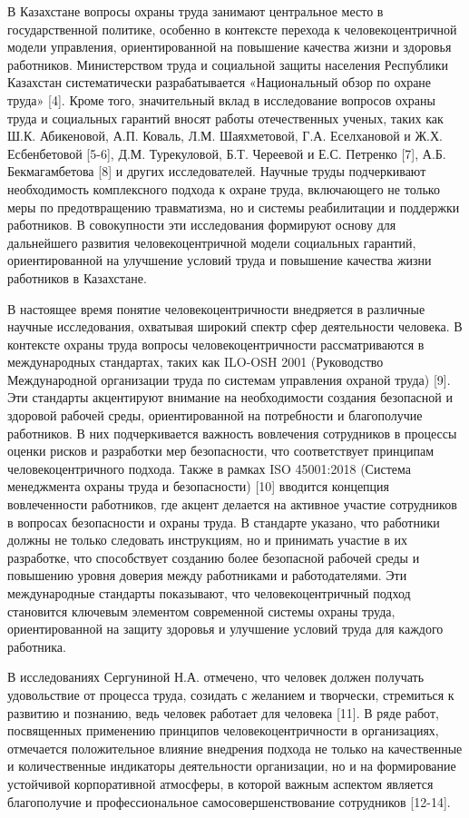 В Казахстане вопросы охраны труда занимают центральное место в
государственной политике, особенно в контексте перехода к
человекоцентричной модели управления, ориентированной на повышение
качества жизни и здоровья работников. Министерством труда и социальной
защиты населения Республики Казахстан систематически разрабатывается
«Национальный обзор по охране труда» {[}4{]}. Кроме того, значительный
вклад в исследование вопросов охраны труда и социальных гарантий вносят
работы отечественных ученых, таких как Ш.К. Абикеновой, А.П. Коваль,
Л.М. Шаяхметовой, Г.А. Еселхановой и Ж.Х. Есбенбетовой {[}5-6{]}, Д.М.
Турекуловой, Б.Т. Череевой и Е.С. Петренко {[}7{]}, А.Б. Бекмагамбетова
{[}8{]} и других исследователей. Научные труды подчеркивают
необходимость комплексного подхода к охране труда, включающего не только
меры по предотвращению травматизма, но и системы реабилитации и
поддержки работников. В совокупности эти исследования формируют основу
для дальнейшего развития человекоцентричной модели социальных гарантий,
ориентированной на улучшение условий труда и повышение качества жизни
работников в Казахстане.

В настоящее время понятие человекоцентричности внедряется в различные
научные исследования, охватывая широкий спектр сфер деятельности
человека. В контексте охраны труда вопросы человекоцентричности
рассматриваются в международных стандартах, таких как ILO-OSH 2001
(Руководство Международной организации труда по системам управления
охраной труда) {[}9{]}. Эти стандарты акцентируют внимание на
необходимости создания безопасной и здоровой рабочей среды,
ориентированной на потребности и благополучие работников. В них
подчеркивается важность вовлечения сотрудников в процессы оценки рисков
и разработки мер безопасности, что соответствует принципам
человекоцентричного подхода. Также в рамках ISO 45001:2018 (Система
менеджмента охраны труда и безопасности) {[}10{]} вводится концепция
вовлеченности работников, где акцент делается на активное участие
сотрудников в вопросах безопасности и охраны труда. В стандарте указано,
что работники должны не только следовать инструкциям, но и принимать
участие в их разработке, что способствует созданию более безопасной
рабочей среды и повышению уровня доверия между работниками и
работодателями. Эти международные стандарты показывают, что
человекоцентричный подход становится ключевым элементом современной
системы охраны труда, ориентированной на защиту здоровья и улучшение
условий труда для каждого работника.

В исследованиях Сергуниной Н.А. отмечено, что человек должен получать
удовольствие от процесса труда, созидать с желанием и творчески,
стремиться к развитию и познанию, ведь человек работает для человека
{[}11{]}. В ряде работ, посвященных применению принципов
человекоцентричности в организациях, отмечается положительное влияние
внедрения подхода не только на качественные и количественные индикаторы
деятельности организации, но и на формирование устойчивой корпоративной
атмосферы, в которой важным аспектом является благополучие и
профессиональное самосовершенствование сотрудников {[}12-14{]}.

